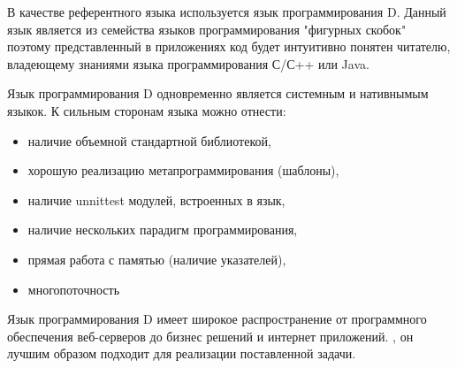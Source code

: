В качестве референтного языка используется язык программирования D. Данный язык является из семейства языков программирования "фигурных скобок"
поэтому представленный в приложениях код будет интуитивно понятен читателю, владеющему знаниями языка программирования С/С++ или Java.

Язык программирования D одновременно является системным и нативнымым языкок. К сильным сторонам языка можно отнести:
\begin{itemize}
 \item наличие объемной стандартной библиотекой,
 \item хорошую реализацию метапрограммирования (шаблоны),
 \item наличие unnittest модулей, встроенных в язык,
 \item наличие нескольких парадигм программирования,
 \item прямая работа с памятью (наличие указателей),
 \item многопоточность 
\end{itemize}

Язык программирования D имеет широкое распространение от программного обеспечения веб-серверов до бизнес решений и интернет приложений.
, он лучшим образом подходит для реализации поставленной задачи.